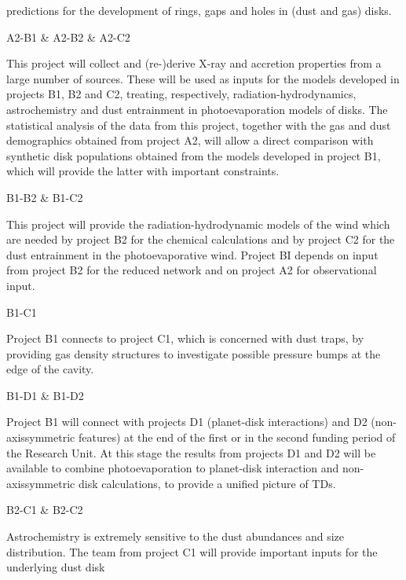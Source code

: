 \documentclass[10pt,fleqn,twoside]{article}
\begin{document}
predictions for the development of rings, gaps and holes in (dust and
gas) disks. \\
\begin{Emphasize}  A2-B1 \& A2-B2 \& A2-C2 \end{Emphasize} This project will collect
and (re-)derive X-ray and accretion properties 
from a large number of sources. These will be used as inputs for the models
developed in projects B1, B2 and C2, treating, respectively,
radiation-hydrodynamics, astrochemistry and dust entrainment in
photoevaporation models of disks. The statistical analysis of the
data from this project, together with the gas and dust demographics
obtained from project A2, will allow a direct comparison with synthetic disk
populations obtained from the models developed in project B1, which
will provide the latter with important constraints. \\
\begin{Emphasize}  B1-B2 \& B1-C2 \end{Emphasize}  
 This project will provide the radiation-hydrodynamic models of the
wind which are needed by project B2 for the
chemical calculations and by project C2 for the dust
entrainment in the photoevaporative wind. Project BI depends on input
from project B2 for the 
reduced network and on project A2 for observational input. \\
\begin{Emphasize}  B1-C1  \end{Emphasize}  Project B1 connects to project C1, which is concerned with
dust traps, by providing gas density structures to investigate
possible pressure bumps at the edge of the cavity. \\
\begin{Emphasize}  B1-D1 \& B1-D2 \end{Emphasize} 
Project B1 will connect with projects D1 (planet-disk
interactions) and D2 (non-axissymmetric features) at the end of
the first or in the second funding period of the Research Unit. At
this stage the results from projects D1 and D2 will be available to
combine photoevaporation to planet-disk interaction and
non-axissymmetric disk calculations, to provide a unified picture
of TDs. \\
\begin{Emphasize} B2-C1 \& B2-C2  \end{Emphasize}
Astrochemistry is extremely sensitive to the dust abundances and size
distribution. The team from 
project C1 will provide important inputs for the underlying dust disk 
\end{document}
